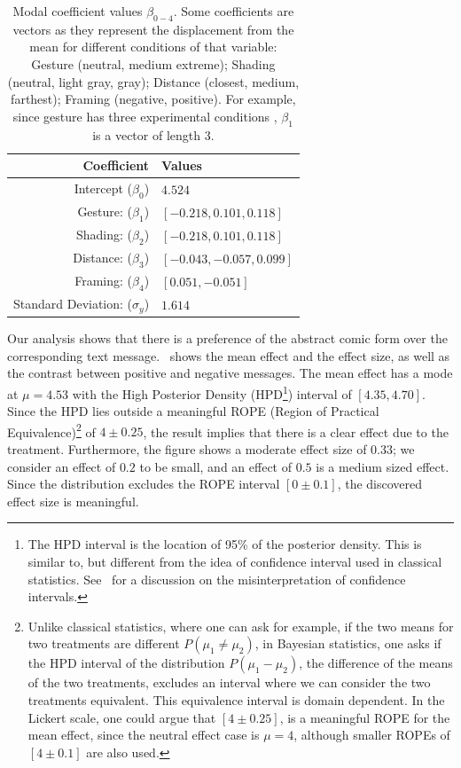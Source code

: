 \begin{table}[tb]%
 \centering
 \caption{Modal coefficient values $\beta_{0-4}$. Some coefficients are vectors as they represent the displacement from the mean for different conditions of that variable: Gesture (neutral, medium extreme); Shading (neutral, light gray, gray); Distance (closest, medium, farthest); Framing (negative, positive). For example, since gesture has three experimental conditions , $\beta_1$ is a vector of length 3.}\label{tab:modal values}
 \begin{tabular}{@{}rl@{}} \toprule
  Coefficient                                       & Values                     \\ \midrule
  Intercept ($\beta_0$)                             & $4.524$                    \\
  Gesture:  ($\beta_1$)   & $[-0.218, 0.101, 0.118]$   \\
  Shading:  ($\beta_2$)  & $ [-0.218 , 0.101, 0.118]$ \\
  Distance:  ($\beta_3$) & $[-0.043, -0.057, 0.099]$  \\
  Framing: ($\beta_4$)         & $[ 0.051, -0.051]$         \\
  Standard Deviation: ($\sigma_y$)                   & $1.614$                    \\ \bottomrule
 \end{tabular}
\end{table}




Our analysis shows that there is a preference of the abstract comic form over the corresponding text message.~ shows the mean effect and the effect size, as well as the contrast between positive and negative messages. The mean effect has a mode at $\mu=4.53$ with the High Posterior Density (HPD\footnote{The HPD interval is the location of 95\% of the posterior density. This is similar to, but different from the idea of confidence interval used in classical statistics. See~\textcite{Hoekstra2014} for a discussion on the misinterpretation of confidence intervals.}) interval of $[4.35, 4.70]$. Since the HPD lies outside a meaningful ROPE (Region of Practical Equivalence)\footnote{Unlike classical statistics, where one can ask for example, if the two means for two treatments are different $P(\mu_1\neq \mu_2)$, in Bayesian statistics, one asks if the HPD interval of the distribution $P(\mu_1-\mu_2)$, the difference of the means of the two treatments, excludes an interval where we can consider the two treatments equivalent. This equivalence interval is domain dependent. In the Lickert scale, one could argue that $[4 \pm 0.25]$, is a meaningful ROPE for the mean effect, since the neutral effect case is $\mu=4$, although smaller ROPEs of $[4 \pm 0.1]$ are also used.} of $4 \pm 0.25$, the result implies that there is a clear effect due to the treatment. Furthermore, the figure shows a moderate effect size of $0.33$; we consider an effect of $0.2$ to be small, and an effect of $0.5$ is a medium sized effect. Since the distribution excludes the ROPE interval $[0 \pm 0.1]$, the discovered effect size is meaningful.

